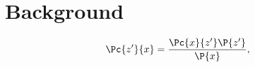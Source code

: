 \chapter{Background}
\label{chap:background}

\begin{align}
  \label{eq:bayes}
  \Pc{z'}{x} &= \frac{\Pc{x}{z'} \P{z'}}{\P{x}}, %
\end{align}